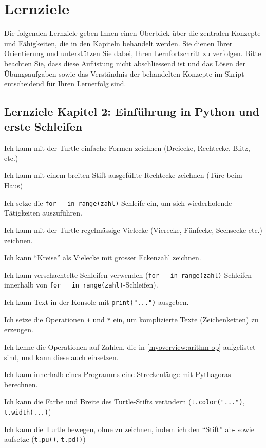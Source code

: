 \chapter{Lernziele}

Die folgenden Lernziele geben Ihnen einen Überblick über die zentralen Konzepte und Fähigkeiten, die in den Kapiteln behandelt werden. Sie dienen Ihrer Orientierung und unterstützen Sie dabei, Ihren Lernfortschritt zu verfolgen. Bitte beachten Sie, dass diese Auflistung nicht abschliessend ist und das Lösen der Übungsaufgaben sowie das Verständnis der behandelten Konzepte im Skript entscheidend für Ihren Lernerfolg sind.

\section*{Lernziele Kapitel 2: Einführung in Python und erste Schleifen}
\begin{todolist}
    \item Ich kann mit der Turtle einfache Formen zeichnen (Dreiecke, Rechtecke, Blitz, etc.)
    \item Ich kann mit einem breiten Stift ausgefüllte Rechtecke zeichnen (Türe beim Haus)
    \item Ich setze die \lstinline|for _ in range(zahl)|-Schleife ein, um sich wiederholende Tätigkeiten auszuführen.
    \item Ich kann mit der Turtle regelmässige Vielecke (Vierecke, Fünfecke, Sechsecke etc.) zeichnen.
    \item Ich kann \enquote{Kreise} als Vielecke mit grosser Eckenzahl zeichnen.
    \item Ich kann verschachtelte Schleifen verwenden (\lstinline|for _ in range(zahl)|-Schleifen innerhalb von \lstinline|for _ in range(zahl)|-Schleifen).
    \item Ich kann Text in der Konsole mit \lstinline|print("...")| ausgeben.
    \item Ich setze die Operationen \lstinline|+| und \lstinline|*| ein, um komplizierte Texte (Zeichenketten) zu erzeugen.
    \item Ich kenne die Operationen auf Zahlen, die in \cref{myoverview:arithm-op} aufgelistet sind, und kann diese auch einsetzen.
    \item Ich kann innerhalb eines Programms eine Streckenlänge mit Pythagoras berechnen.
    \item Ich kann die Farbe und Breite des Turtle-Stifts verändern (\lstinline|t.color("...")|, \lstinline|t.width(...)|)
    \item Ich kann die Turtle bewegen, ohne zu zeichnen, indem ich den \enquote{Stift} ab- sowie aufsetze (\lstinline|t.pu()|, \lstinline|t.pd()|)
\end{todolist}
